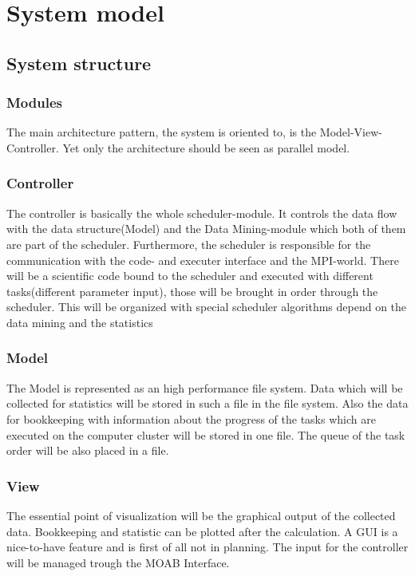 \section{System model}%
	\subsection{System structure}
			\subsubsection{Modules}
				The main architecture pattern, the system is oriented to, is the Model-View-Controller. Yet only the architecture should be seen as parallel model.
			\subsubsection{Controller}
				The controller is basically the whole scheduler-module. It controls the data flow with the 				data structure(Model) and the Data Mining-module which both of them are part of the 						scheduler. Furthermore, the scheduler is responsible for the communication with the code-             				and executer interface and the MPI-world. There will be a scientific code bound to the 						scheduler and executed with different tasks(different parameter input), those will be 						brought in order through the scheduler. This will be organized with special scheduler 						algorithms depend on the data mining and the statistics
			\subsubsection{Model}
				The Model is represented as an high performance file system. Data which will be collected 					for statistics will be stored in such a file in the file system. Also the data for 							bookkeeping with information about the progress of the tasks which are executed on the 						computer cluster will be stored in one file. The queue of the task order will be also 						placed in a file. 
			\subsubsection{View}
				The essential point of visualization will be the graphical output of the collected data. 					Bookkeeping and statistic can be plotted after the calculation.
				A GUI is a nice-to-have feature and is first of all not in planning. The input for the 						controller will be managed trough the MOAB Interface.
\newpage
